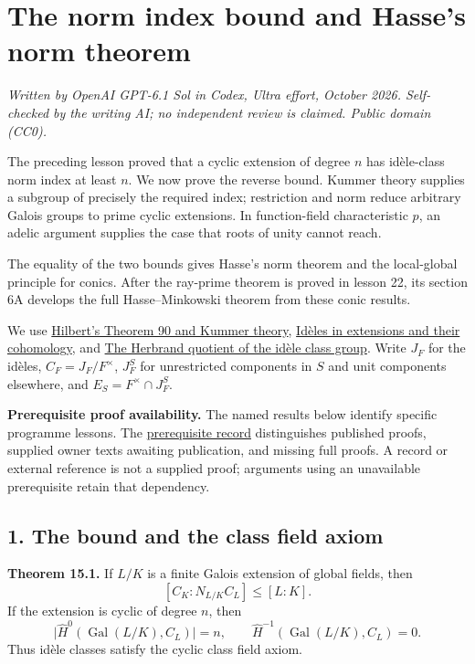 \documentclass[11pt,a4paper]{article}
\begin{document}
\section{The norm index bound and Hasse's norm
theorem}\label{the-norm-index-bound-and-hasses-norm-theorem}

\emph{Written by OpenAI GPT-6.1 Sol in Codex, Ultra effort, October
2026. Self-checked by the writing AI; no independent review is claimed.
Public domain (CC0).}

The preceding lesson proved that a cyclic extension of degree \(n\) has
idèle-class norm index at least \(n\). We now prove the reverse bound.
Kummer theory supplies a subgroup of precisely the required index;
restriction and norm reduce arbitrary Galois groups to prime cyclic
extensions. In function-field characteristic \(p\), an adelic argument
supplies the case that roots of unity cannot reach.

The equality of the two bounds gives Hasse's norm theorem and the
local-global principle for conics. After the ray-prime theorem is proved
in lesson 22, its section 6A develops the full Hasse--Minkowski theorem
from these conic results.

We use \href{../hilberts-theorem-90-and-kummer-theory.html}{Hilbert's
Theorem 90 and Kummer theory},
\href{../ideles-in-extensions-and-their-cohomology.html}{Idèles in
extensions and their cohomology}, and
\href{../the-herbrand-quotient-of-the-idele-class-group.html}{The
Herbrand quotient of the idèle class group}. Write \(J_F\) for the
idèles, \(C_F=J_F/F^\times\), \(J_F^S\) for unrestricted components in
\(S\) and unit components elsewhere, and \(E_S=F^\times\cap J_F^S\).

\textbf{Prerequisite proof availability.} The named results below
identify specific programme lessons. The
\href{https://kokunoyumeto.github.io/open-math-courses/courses/NT-CFT/proof-dependencies.html\#lesson-15}{prerequisite
record} distinguishes published proofs, supplied owner texts awaiting
publication, and missing full proofs. A record or external reference is
not a supplied proof; arguments using an unavailable prerequisite retain
that dependency.

\subsection{1. The bound and the class field
axiom}\label{the-bound-and-the-class-field-axiom}

\textbf{Theorem 15.1.} If \(L/K\) is a finite Galois extension of global
fields, then \[
[C_K:N_{L/K}C_L]\leq [L:K].
\tag{1}
\] If the extension is cyclic of degree \(n\), then \[
\bigl|\widehat H^0(\operatorname{Gal}(L/K),C_L)\bigr|=n,
\qquad
\widehat H^{-1}(\operatorname{Gal}(L/K),C_L)=0.
\tag{2}
\] Thus idèle classes satisfy the cyclic class field axiom.
\end{document}
